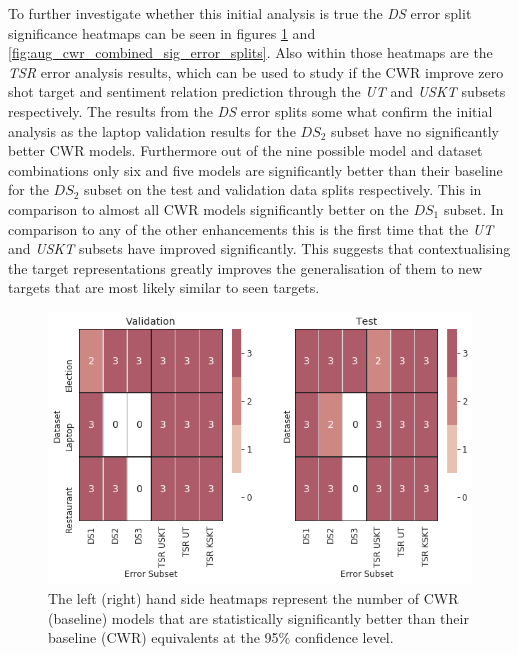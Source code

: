 To further investigate whether this initial analysis is true the \textit{DS} error split significance heatmaps can be seen in figures \ref{fig:aug_cwr_dataset_sig_error_splits} and \ref{fig:aug_cwr_combined_sig_error_splits}. Also within those heatmaps are the \textit{TSR} error analysis results, which can be used to study if the CWR improve zero shot target and sentiment relation prediction through the \textit{UT} and \textit{USKT} subsets respectively. The results from the \textit{DS} error splits some what confirm the initial analysis as the laptop validation results for the $DS_2$ subset have no significantly better CWR models. Furthermore out of the nine possible model and dataset combinations only six and five models are significantly better than their baseline for the $DS_2$ subset on the test and validation data splits respectively. This in comparison to almost all CWR models significantly better on the $DS_1$ subset. In comparison to any of the other enhancements this is the first time that the \textit{UT} and \textit{USKT} subsets have improved significantly. This suggests that contextualising the target representations greatly improves the generalisation of them to new targets that are most likely similar to seen targets.

\begin{figure}[!h]
    \centering
    \includegraphics[scale=0.5]{images/augmentation/methods_performance/CWR/cwr_dataset_sig_error_splits.png}
    \caption{The left (right) hand side heatmaps represent the number of CWR (baseline) models that are statistically significantly better than their baseline (CWR) equivalents at the 95\% confidence level.}
    \label{fig:aug_cwr_dataset_sig_error_splits}
\end{figure}

